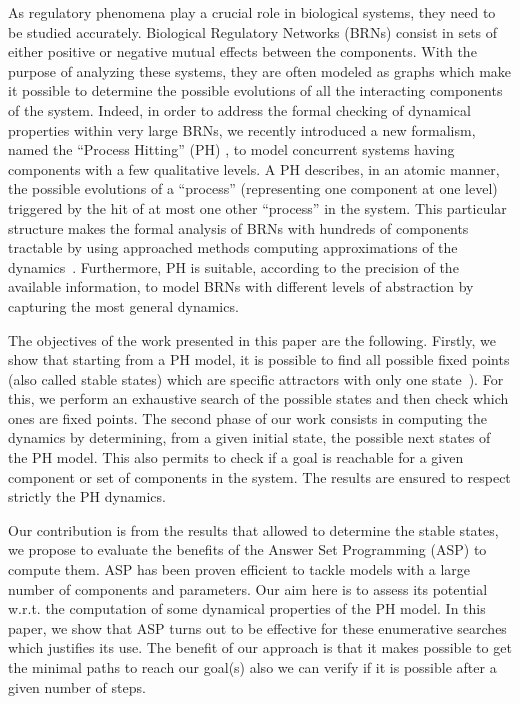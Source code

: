 As regulatory phenomena play a crucial role in biological systems, they need to
be studied accurately. Biological Regulatory Networks (BRNs) consist in sets
of either positive or negative mutual effects between the components. With the
purpose of analyzing these systems, they are often modeled as graphs which make
it possible to determine the possible evolutions of all the interacting components of the system. Indeed, in order to address the formal checking of dynamical properties within very large BRNs, we recently introduced a new formalism, named the “Process Hitting” (PH) \cite{PMR10-TCSB}, to model concurrent systems having components with a few qualitative levels. A PH describes, in an atomic manner, the possible evolutions of a “process” (representing one component at one level) triggered by the hit of at most one other “process” in the system. This particular structure makes the formal analysis of BRNs with hundreds of components tractable by using approached methods computing approximations of the dynamics~\cite{PMR12-MSCS}. Furthermore, PH is suitable, according to the precision of the available information, to model BRNs with different levels of abstraction by capturing the most general dynamics.

The objectives of the work presented in this paper are the following.
Firstly, we show that starting from a PH model, it is possible to find all possible
fixed points (also called stable states)
which are specific attractors with only one state~\cite{wuensche1998genomic}).
For this, we perform an exhaustive search of the possible states and then check which ones are fixed points.
The second phase of our work consists in computing the dynamics by determining, from a given initial state, the possible next states of the PH model.
This also permits to check if a goal is reachable for a given component or set of components in the system.
The results are ensured to respect strictly the PH dynamics.

Our contribution is from the results that allowed to determine the stable states, we propose to evaluate the benefits of the Answer Set Programming (ASP) \cite{baral2003knowledge} to compute them. ASP has been proven efficient to tackle models with a large number of components and parameters. Our aim here is to assess its potential w.r.t. the computation of some dynamical properties of the PH model. In this paper, we show that ASP turns out to be effective for these enumerative searches which justifies its use. The benefit of our approach is that it makes possible to get the minimal paths to reach our goal(s) also we can verify if it is possible after a given number of steps. %

